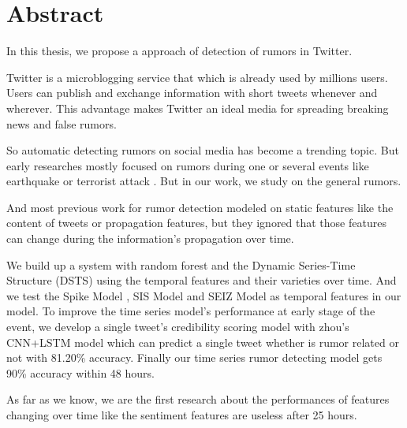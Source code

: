 
\chapter{Abstract}
 
In this thesis, we propose a approach of detection of rumors in Twitter. 

Twitter is a microblogging service that which is already used by millions users. Users can publish and exchange information with short tweets whenever and wherever. This advantage makes Twitter an ideal media for spreading breaking news and false rumors.  

So automatic detecting rumors on social media has become a trending topic. But early researches mostly focused on rumors during one or several events like earthquake or terrorist attack \cite{oh2010exploration} \cite{tanaka2012transmission}\cite{starbird2014rumors}. But in our work, we study on the general rumors.

And most previous work for rumor detection modeled on static features like the content of tweets or propagation features, but they ignored that those features can change during the information's propagation over time.

We build up a system with random forest and the Dynamic Series-Time Structure (DSTS) \cite{ma2015detect} using the temporal features and their varieties over time. And we test the Spike Model \cite{kwon2013prominent}, SIS Model and SEIZ Model  \cite{jin2013epidemiological} as temporal features in our model. To improve the time series model's performance at early stage of the event, we develop a single tweet's credibility scoring model with zhou's CNN+LSTM model \cite{zhou2015c} which can predict a single tweet whether is rumor related or not with 81.20\% accuracy. Finally our time series rumor detecting model gets 90\% accuracy within 48 hours. 

As far as we know, we are the first research about the performances of features changing over time like the sentiment features are useless after 25 hours.    


